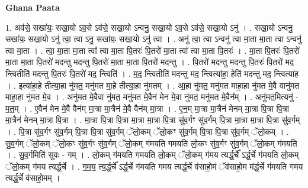 \documentclass[17pt]{extarticle}
\begin{document}
\textbf{Ghana Paata } \newline

1. अव॑से॒ सखा॑यः॒ सखा॒यो ऽव॒से ऽव॑से॒ सखा॒यो ऽन्वनु॒ सखा॒यो ऽव॒से ऽव॑से॒ सखा॒यो ऽनु॑ । . सखा॒यो ऽन्वनु॒ सखा॑यः॒ सखा॒यो ऽनु॑ त्वा॒ त्वा ऽनु॒ सखा॑यः॒ सखा॒यो ऽनु॑ त्वा । . अनु॑ त्वा॒ त्वा ऽन्वनु॑ त्वा मा॒ता मा॒ता त्वा ऽन्वनु॑ त्वा मा॒ता । . त्वा॒ मा॒ता मा॒ता त्वा᳚ त्वा मा॒ता पि॒तरः॑ पि॒तरो॑ मा॒ता त्वा᳚ त्वा मा॒ता पि॒तरः॑ । . मा॒ता पि॒तरः॑ पि॒तरो॑ मा॒ता मा॒ता पि॒तरो॑ मदन्तु मदन्तु पि॒तरो॑ मा॒ता मा॒ता पि॒तरो॑ मदन्तु । . पि॒तरो॑ मदन्तु मदन्तु पि॒तरः॑ पि॒तरो॑ मद॒ न्त्वितीति॑ मदन्तु पि॒तरः॑ पि॒तरो॑ मद॒ न्त्विति॑ । . म॒द॒ न्त्वितीति॑ मदन्तु मद॒ न्त्वित्या॑हा॒ हेति॑ मदन्तु मद॒ न्त्वित्या॑ह । . इत्या॑हा॒हे तीत्या॒हा नु॑मत॒ मनु॑मत मा॒हे तीत्या॒हा नु॑मतम् । . आ॒हा नु॑मत॒ मनु॑मत माहा॒हा नु॑मत मे॒वै वानु॑मत माहा॒हा नु॑मत मे॒व । . अनु॑मत मे॒वैवा नु॑मत॒ मनु॑मत मे॒वैन॑ मेन मे॒वा नु॑मत॒ मनु॑मत मे॒वैन᳚म् । . अनु॑मत॒मित्यनु॑ - म॒त॒म् । . ए॒वैन॑ मेन मे॒वै वैन॑म् मा॒त्रा मा॒त्रैन॑ मे॒वै वैन॑म् मा॒त्रा । . ए॒न॒म् मा॒त्रा मा॒त्रैन॑ मेनम् मा॒त्रा पि॒त्रा पि॒त्रा मा॒त्रैन॑ मेनम् मा॒त्रा पि॒त्रा । . मा॒त्रा पि॒त्रा पि॒त्रा मा॒त्रा मा॒त्रा पि॒त्रा सु॑व॒र्गꣳ सु॑व॒र्गम् पि॒त्रा मा॒त्रा मा॒त्रा पि॒त्रा सु॑व॒र्गम् । . पि॒त्रा सु॑व॒र्गꣳ सु॑व॒र्गम् पि॒त्रा पि॒त्रा सु॑व॒र्गम् ॅलो॒कम् ॅलो॒कꣳ सु॑व॒र्गम् पि॒त्रा पि॒त्रा सु॑व॒र्गम् ॅलो॒कम् । . सु॒व॒र्गम् ॅलो॒कम् ॅलो॒कꣳ सु॑व॒र्गꣳ सु॑व॒र्गम् ॅलो॒कम् ग॑मयति गमयति लो॒कꣳ सु॑व॒र्गꣳ सु॑व॒र्गम् ॅलो॒कम् ग॑मयति । . सु॒व॒र्गमिति॑ सुवः - गम् । . लो॒कम् ग॑मयति गमयति लो॒कम् ॅलो॒कम् ग॑मय त्यर्द्ध॒र्चे᳚ ऽर्द्ध॒र्चे ग॑मयति लो॒कम् ॅलो॒कम् ग॑मय त्यर्द्ध॒र्चे । . ग॒म॒य॒ त्य॒र्द्ध॒र्चे᳚ ऽर्द्ध॒र्चे ग॑मयति गमय त्यर्द्ध॒र्चे व॑साहो॒मं ॅव॑साहो॒म म॑र्द्ध॒र्चे ग॑मयति गमय त्यर्द्ध॒र्चे व॑साहो॒मम् । \newline
\end{document}
